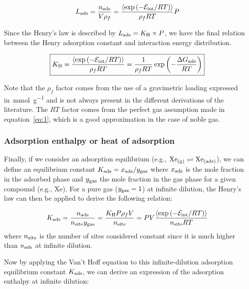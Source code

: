 \documentclass[main.tex]{subfiles}
\begin{document}
\begin{equation}
  L_{\text{ads}} = \dfrac{n_{\text{ads}}}{V\rho_f} = \dfrac{\langle \exp\left(-\mathcal{E}_{\text{int}}/RT\right) \rangle}{\rho_f RT} P
\end{equation}

Since the Henry's law is described by $L_{\text{ads}}=K_{\text{H}} \times P$, we have the final relation between the Henry adsorption constant and interaction energy distribution.

\begin{equation}\label{eq:henry}
    \boxed{
    K_{\text{H}} = \dfrac{\langle \exp\left(-\mathcal{E}_{\text{int}}/RT\right) \rangle}{\rho_f RT} = \dfrac{1}{\rho_f RT} \exp\left(-\dfrac{\Delta G_{\text{ads}}}{RT}\right)
    }
\end{equation}

Note that the $\rho_f$ factor comes from the use of a gravimetric loading expressed in~\si{\milli\mole\per\gram} and is not always present in the different derivations of the literature.\autocite{PoreBlazer} The $RT$ factor comes from the perfect gas assumption made in equation~\ref{eq:1}, which is a good approximation in the case of noble gas. 

\subsubsection{Adsorption enthalpy or heat of adsorption}


Finally, if we consider an adsorption equilibrium (e.g., $\text{Xe}_{\text{(g)}} \rightleftharpoons \text{Xe}_{\text{(ads)}}$), we can define an equilibrium constant $K_{\text{ads}} = x_{\text{ads}}/y_{\text{gas}}$ where $x_{\text{ads}}$ is the mole fraction in the adsorbed phase and $y_{\text{gas}}$ the mole fraction in the gas phase for a given compound (e.g., Xe). For a pure gas ($y_{\text{gas}}=1$) at infinite dilution, the Henry's law can then be applied to derive the following relation:

\begin{equation}\label{eq:eq_cst}
  K_{\text{ads}} = \dfrac{n_{\text{ads}}}{n_{\text{site}}y_{\text{gas}}} = \dfrac{K_{\text{H}}P\rho_f V}{n_{\text{site}}} = PV \dfrac{\langle \exp\left(-\mathcal{E}_{\text{int}}/RT\right) \rangle}{n_{\text{site}}RT}
\end{equation}
where $n_{\text{site}}$ is the number of sites considered constant since it is much higher than $n_{\text{ads}}$ at infinite dilution.

Now by applying the Van't Hoff equation to this infinite-dilution adsorption equilibrium constant $K_{\text{ads}}$, we can derive an expression of the adsorption enthalpy at infinite dilution:
\end{document}
